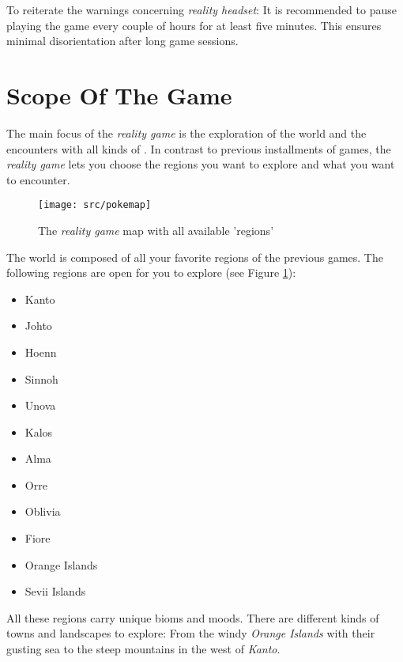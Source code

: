 To reiterate the warnings concerning \emph{\poke{} reality headset}: It is recommended to pause playing the game every couple of hours for at least five minutes. This ensures minimal disorientation after long game sessions.

\section{Scope Of The Game}

The main focus of the \emph{\poke{} reality game} is the exploration of the \poke{} world and the encounters with all kinds of \poke{}. In contrast to previous installments of \poke{} games, the \emph{\poke{} reality game} lets you choose the regions you want to explore and what \poke{} you want to encounter.

\begin{figure}[!ht]
\begin{center}
\texttt{[image: src/pokemap]}
\end{center}
\caption[The \emph{\pokeT{} reality game} map with all available 'regions']{The \emph{\poke{} reality game} map with all available 'regions'}
\label{pokemap}
\end{figure}

The \poke{} world is composed of all your favorite regions of the previous games. The following regions are open for you to explore (see Figure \ref{pokemap}):
\begin{multicols}{2}
\begin{itemize}
\item Kanto
\item Johto
\item Hoenn
\item Sinnoh
\item Unova
\item Kalos
\item Alma
\item Orre
\item Oblivia
\item Fiore
\item Orange Islands
\item Sevii Islands
\end{itemize} 
\end{multicols}

All these regions carry unique bioms and moods. There are different kinds of towns and landscapes to explore: From the windy \emph{Orange Islands} with their gusting sea to the steep mountains in the west of \emph{Kanto}.

